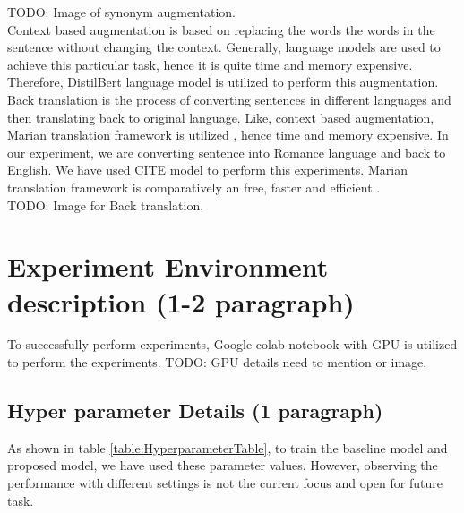 \documentclass[%
	BCOR=8mm, %
	DIV=12, 
	toc=bibliography, %
	toc=listof, %
	oneside, %
	egregdoesnotlikesansseriftitles, %
	]{scrbook}
\begin{document}
TODO: Image of synonym augmentation. \\

Context based augmentation is based on replacing the words the words in the sentence without changing the  context. Generally, language models are used to achieve this 
particular task, hence it is quite time and memory expensive. Therefore, DistilBert language model is utilized to perform this augmentation. \\

Back translation is the process of converting sentences in different languages and then translating back to original language.  Like, context based augmentation, Marian translation 
framework is utilized , hence time and memory expensive. In our experiment, we are converting sentence into Romance language and back to English. We have used CITE model 
to perform this experiments. Marian translation framework is comparatively an free, faster and efficient . \\

TODO: Image for Back translation.


\section{Experiment Environment description (1-2 paragraph)}

To successfully perform experiments, Google colab notebook with GPU is utilized to perform the experiments. 
TODO: GPU details need to mention or image. 

\subsection{ Hyper parameter Details (1 paragraph)}

 As shown in table \ref{table:HyperparameterTable}, to train the baseline model and proposed model, we have used these parameter values. However, observing the performance 
 with different settings is not the current focus  and open for future task.
 
\end{document}

